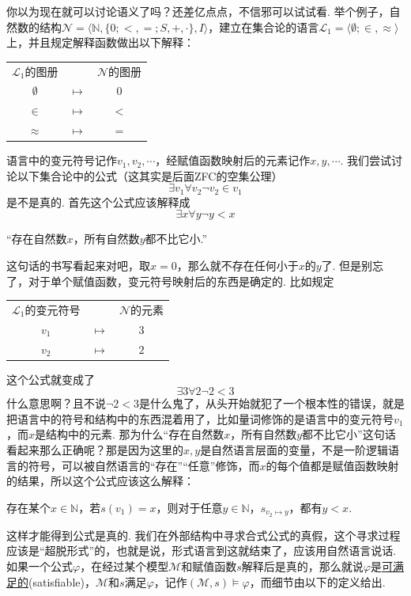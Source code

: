 你以为现在就可以讨论语义了吗？还差亿点点，不信邪可以试试看. 举个例子，自然数的结构\(\mathcal{N} = \langle \mathbb{N}, \{0; <, =; S,+,\cdot\}, I \rangle\)，建立在集合论的语言\(\mathcal{L}_1 = \langle \emptyset; \in, \approx \rangle\)上，并且规定解释函数做出以下解释：
\begin{center}
    \begin{tabular}{ccc}
        \(\mathcal{L}_1\)的图册 & & \(\mathcal{N}\)的图册 \\
        \(\emptyset\) & \(\longmapsto\) & \(0\) \\
        \(\in\) & \(\longmapsto\) & \(<\) \\
        \(\approx\) & \(\longmapsto\) & \(=\)
    \end{tabular}
\end{center}
语言中的变元符号记作\(v_1, v_2, \cdots\)，经赋值函数映射后的元素记作\(x,y,\cdots\). 我们尝试讨论以下集合论中的公式（这其实是后面\textsf{ZFC}的空集公理）
\[\exists v_1 \forall v_2 \neg v_2 \in v_1\]
是不是真的. 首先这个公式应该解释成
\[\exists x \forall y \neg y < x\]
\begin{center}
    “存在自然数\(x\)，所有自然数\(y\)都不比它小.”
\end{center}
这句话的书写看起来对吧，取\(x=0\)，那么就不存在任何小于\(x\)的\(y\)了. 但是别忘了，对于单个赋值函数，变元符号映射后的东西是确定的. 比如规定
\begin{center}
    \begin{tabular}{ccc}
        \(\mathcal{L}_1\)的变元符号 & & \(\mathcal{N}\)的元素 \\
        \(v_1\) & \(\longmapsto\) & \(3\) \\
        \(v_2\) & \(\longmapsto\) & \(2\)
    \end{tabular}
\end{center}
这个公式就变成了
\[\exists 3 \forall 2 \neg 2 < 3\]
什么意思啊？且不说\(\neg 2<3\)是什么鬼了，从头开始就犯了一个根本性的错误，就是把语言中的符号和结构中的东西混着用了，比如量词修饰的是语言中的变元符号\(v_1\)，而\(x\)是结构中的元素. 那为什么“存在自然数\(x\)，所有自然数\(y\)都不比它小”这句话看起来那么正确呢？那是因为这里的\(x,y\)是自然语言层面的变量，不是一阶逻辑语言的符号，可以被自然语言的“存在”“任意”修饰，而\(x\)的每个值都是赋值函数映射的结果，所以这个公式应该这么解释：
\begin{center}
    存在某个\(x \in \mathbb{N}\)，若\(s(v_1) = x\)，则对于任意\(y \in \mathbb{N}\)，\(s_{v_2 \mapsto y}\)，都有\(y<x\).
\end{center}
这样才能得到公式是真的. 我们在外部结构中寻求合式公式的真假，这个寻求过程应该是“超脱形式”的，也就是说，形式语言到这就结束了，应该用自然语言说话. 如果一个公式\(\varphi\)，在经过某个模型\(\mathcal{M}\)和赋值函数\(s\)解释后是真的，那么就说\(\varphi\)是\underline{可满足的}(satisfiable)，\(\mathcal{M}\)和\(s\)满足\(\varphi\)，记作\((\mathcal{M}, s) \vDash \varphi\)，而细节由以下的定义给出.

